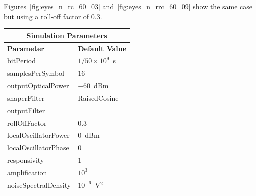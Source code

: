 \begin{refsection}
Figures~\ref{fig:eyes_n_rc_60_03} and~\ref{fig:eyes_n_rrc_60_09} show the same
case but using a roll-off factor of 0.3.
\begin{table}[H]
	\centering
	\footnotesize
	\begin{tabular}{|l|l|}
		\hline
		\multicolumn{2}{|c|}{ \textbf{Simulation Parameters} } \\
		\hline
		\textbf{Parameter}     & \textbf{Default Value}                                     \\\hline
		bitPeriod              & $1/50\times10^9$~s														\\\hline
		samplesPerSymbol       & $16$                                                       \\\hline
		outputOpticalPower     & $-60$~dBm 													\\ \hline
		shaperFilter	       & RaisedCosine												\\ \hline
		outputFilter		   &   												\\ \hline
		rollOffFactor		   & 0.3														\\ \hline
		localOscillatorPower   & $0$~dBm                                                    \\ \hline
		localOscillatorPhase   & $0$                                                        \\ \hline
		responsivity           & $1$                                                        \\ \hline
		amplification          & $10^3$                                                     \\ \hline
		noiseSpectralDensity   & $10^{-6}$~V$^2$                             					\\ \hline

\end{tabular}
\end{table}
\end{refsection}
